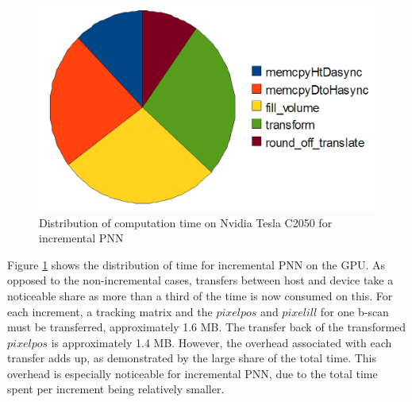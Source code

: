 	\begin{figure}[h]
	\centering
	\includegraphics[height=0.3\textheight]{charts/incr_pnn.png}
	\caption[Distribution of computation time for incremental PNN]{Distribution of computation time on Nvidia Tesla C2050 for incremental PNN}
	\label{fig:incr_pnn_pie}
	\end{figure}
	
	Figure \ref{fig:incr_pnn_pie} shows the distribution of time for incremental PNN on the GPU. As opposed to the non-incremental cases, transfers between host and device take a noticeable share as more than a third of the time is now consumed on this. For each increment, a tracking matrix and the $pixelpos$ and $pixelill$ for one b-scan must be transferred, approximately 1.6 MB. The transfer back of the transformed $pixelpos$ is approximately 1.4 MB. However, the overhead associated with each transfer adds up, as demonstrated by the large share of the total time. This overhead is especially noticeable for incremental PNN, due to the total time spent per increment being relatively smaller.
	
